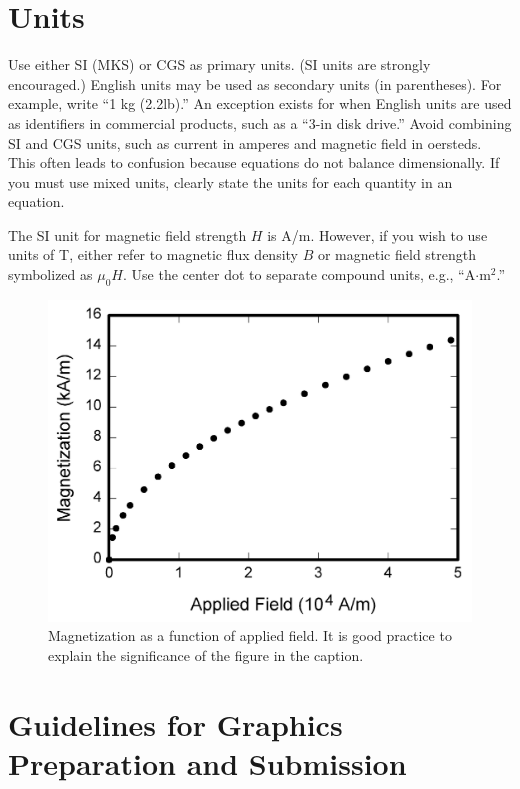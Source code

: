 \documentclass[journal,twoside,web]{ieeecolor}
\begin{document}
\section{Units}
Use either SI (MKS) or CGS as primary units. (SI units are strongly 
encouraged.) English units may be used as secondary units (in parentheses). 
For example, write ``1 kg (2.2lb).'' An exception exists for when 
English units are used as identifiers in commercial products, such as a ``3\textonehalf-in 
disk drive.'' Avoid combining SI and CGS units, such as current in amperes 
and magnetic field in oersteds. This often leads to confusion because 
equations do not balance dimensionally. If you must use mixed units, clearly 
state the units for each quantity in an equation.

The SI unit for magnetic field strength $H$ is A/m. However, if you wish to use 
units of T, either refer to magnetic flux density $B$ or magnetic field 
strength symbolized as $\mu _{0}H$. Use the center dot to separate 
compound units, e.g., ``A$\cdot $m$^{2}$.''

\begin{figure}[!t]
\centerline{\includegraphics[width=\columnwidth]{fig1.png}}
\caption{Magnetization as a function of applied field.
It is good practice to explain the significance of the figure in the caption.}
\label{fig1}
\end{figure}

\section{Guidelines for Graphics Preparation and Submission}
\label{sec:guidelines}
\end{document}
